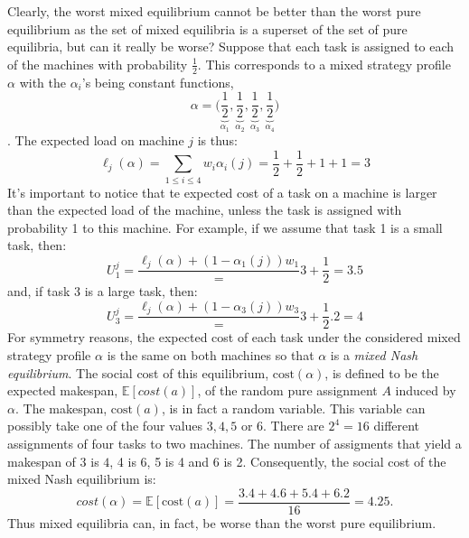 \documentclass[a4paper,11pt]{article}
\newcommand{\E}{{\mathbb E}}
\newcommand{\cost}{\text{cost}}
\begin{document}
Clearly, the worst mixed equilibrium cannot be better than the worst pure equilibrium as the set of mixed equilibria is a superset of the set of pure equilibria, but can it really be worse? Suppose that each task is assigned to each of the machines with probability $\frac{1}{2}$. This corresponds to a mixed strategy profile $\alpha$ with the $\alpha_i$'s being constant functions, $$\alpha = \bigg(\underbrace{\frac{1}{2}}_{\alpha_1}, \underbrace{\frac{1}{2}}_{\alpha_2}, \underbrace{\frac{1}{2}}_{\alpha_3}, \underbrace{\frac{1}{2}}_{\alpha_4}\bigg) $$
. The expected load on machine $j$ is thus:
$$\ell_j(\alpha) = \displaystyle\sum_{1\leq i \leq 4}{w_i\alpha_i(j)} = \frac{1}{2} + \frac{1}{2} + 1 + 1 = 3$$
It's important to notice that te expected cost of a task on a machine is larger than the expected load of the machine, unless the task is assigned with probability 1 to this machine. For example, if we assume that task 1 is a small task, then:
$$U_1^j = \frac{\ell_j(\alpha) + (1 - \alpha_1(j))w_1} = 3 + \frac{1}{2} = 3.5$$
and, if task $3$ is a large task, then:
$$U_3^j = \frac{\ell_j(\alpha) + (1 - \alpha_3(j))w_3} = 3 + \frac{1}{2}.2 = 4$$
For symmetry reasons, the expected cost of each task under the considered mixed strategy profile $\alpha$ is the same on both machines so that $\alpha$ is a \emph{mixed Nash equilibrium}. The social cost of this equilibrium, $\cost(\alpha)$, is defined to be the expected makespan, $\E[cost(a)]$, of the random pure assignment $A$ induced by $\alpha$. The makespan, $\cost(a)$, is in fact a random variable. This variable can possibly take one of the four values $3, 4, 5$ or $6$. There are $2^4 = 16$ different assignments of four tasks to two machines. The number of assigments that yield a makespan of $3$ is $4$, 4 is 6, 5 is 4 and 6 is 2. Consequently, the social cost of the mixed Nash equilibrium is:
$$cost(\alpha) = \E[\cost(a)] = \frac{3.4 + 4.6 + 5.4+ 6.2}{16} = 4.25.$$
Thus mixed equilibria can, in fact, be worse than the worst pure equilibrium.
\end{document}
